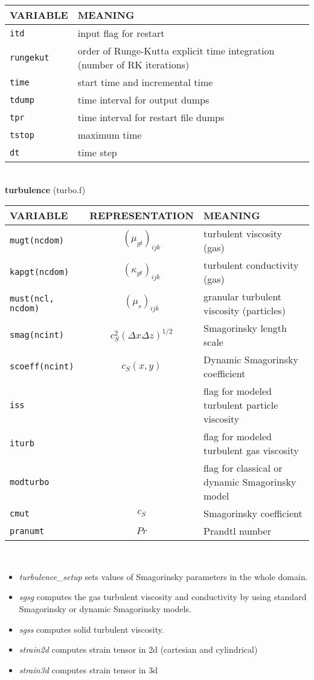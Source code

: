 \begin{tabular}{|p{6cm}|p{6cm}|}\hline
VARIABLE & MEANING\\\hline
\tt itd & input flag for restart \\\hline
\tt rungekut & order of Runge-Kutta explicit time integration (number of RK iterations) \\\hline
\tt time & start time and incremental time\\\hline
\tt tdump & time interval for output dumps \\\hline
\tt tpr & time interval for restart file dumps \\\hline
\tt tstop & maximum time \\\hline 
\tt dt & time step \\\hline
\end{tabular}\\[5mm]
%
%
{\large{\bf turbulence}} (turbo.f)\\[5mm]
\begin{tabular}{|p{6cm}|c|p{6cm}|}\hline
VARIABLE & REPRESENTATION & MEANING\\\hline
\tt mugt(ncdom) & $(\mu_{gt})_{ijk}$ &  turbulent viscosity (gas)\\\hline
\tt kapgt(ncdom) & $(\kappa_{gt})_{ijk}$ &  turbulent conductivity (gas)\\\hline
\tt must(ncl, ncdom) & $(\mu_s)_{ijk}$ &   granular turbulent viscosity (particles)\\\hline
\tt smag(ncint) & $c_S^2(\Delta x\Delta z)^{1/2}$ &  Smagorinsky length scale \\\hline
\tt scoeff(ncint) & $c_S(x,y)$ &  Dynamic Smagorinsky coefficient \\\hline
\tt iss & $ $ & flag for modeled turbulent particle viscosity \\\hline
\tt iturb & $ $ & flag for modeled turbulent gas viscosity \\\hline
\tt modturbo & $ $ & flag for classical or dynamic Smagorinsky model\\\hline
\tt cmut & $ c_S $ &Smagorinsky coefficient \\\hline
\tt pranumt & $ Pr $ & Prandtl number\\\hline
\end{tabular}\\
\begin{itemize}
\item{\em turbulence\_setup} sets values of Smagorinsky parameters in the whole domain.
\item{\em sgsg} computes the gas turbulent viscosity and conductivity by using standard Smagorinsky
or dynamic Smagorinsky models.
\item{\em sgss} computes solid turbulent viscosity.
\item{\em strain2d} computes strain tensor in 2d (cartesian and cylindrical)
\item{\em strain3d} computes strain tensor in 3d
\end{itemize}
